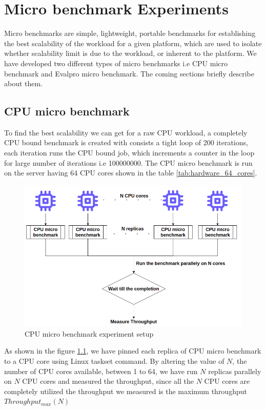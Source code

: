 \documentclass{iitbreport}
\begin{document}
\chapter{Micro benchmark Experiments}\label{micro_benchmark_exps}
Micro benchmarks are simple, lightweight, portable benchmarks for establishing the best
scalability of the workload for a given platform, which are used to isolate whether scalability limit is due to the workload, or inherent to the platform. We have developed two different types of micro benchmarks i.e CPU micro benchmark and Evalpro micro benchmark. The coming sections briefly describe about them.
\section{CPU micro benchmark}
To find the best scalability we can get for a raw CPU workload, a completely CPU bound benchmark is created with consists a tight loop of 200 iterations, each iteration runs the CPU bound job, which increments a counter in the loop for large number  of iterations i.e 100000000. The CPU micro benchmark is run on the server having 64 CPU cores shown in the table \ref{tab:hardware_64_cores}. 

\begin{figure}[!htb]
  \centering
  \includegraphics[width=\linewidth]{Images/cpu_micro_benchmark.png}
  \caption{CPU micro benchmark experiment setup}
  \label{cpu_micro_bench_mark}
\end{figure}

As shown in the figure \ref{cpu_micro_bench_mark}, we have pinned each replica of CPU micro benchmark to a CPU core using Linux taskset command. By altering the value of $N$, the number of CPU cores available, between 1 to 64, we have run $N$ replicas parallely on $N$ CPU cores and measured the throughput, since all the $N$ CPU cores are completely utilized the throughput we measured is the maximum throughput $Throughput_{max}(N)$
\end{document}
